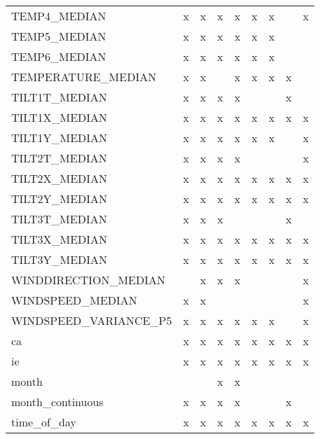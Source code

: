 \begin{longtable}{lllllllll}
          TEMP4\_MEDIAN &      x &      x &      x &      x &      x &      x &        &      x \\
          TEMP5\_MEDIAN &      x &      x &      x &      x &      x &      x &        &        \\
          TEMP6\_MEDIAN &      x &      x &      x &      x &      x &      x &        &        \\
    TEMPERATURE\_MEDIAN &      x &      x &        &      x &      x &      x &      x &        \\
         TILT1T\_MEDIAN &      x &      x &      x &      x &        &        &      x &        \\
         TILT1X\_MEDIAN &      x &      x &      x &      x &      x &      x &      x &      x \\
         TILT1Y\_MEDIAN &      x &      x &      x &      x &      x &      x &        &      x \\
         TILT2T\_MEDIAN &      x &      x &      x &      x &        &        &        &      x \\
         TILT2X\_MEDIAN &      x &      x &      x &      x &      x &      x &      x &      x \\
         TILT2Y\_MEDIAN &      x &      x &      x &      x &      x &      x &      x &      x \\
         TILT3T\_MEDIAN &      x &      x &      x &        &        &        &      x &        \\
         TILT3X\_MEDIAN &      x &      x &      x &      x &      x &      x &      x &      x \\
         TILT3Y\_MEDIAN &      x &      x &      x &      x &      x &      x &      x &      x \\
  WINDDIRECTION\_MEDIAN &        &      x &      x &      x &        &        &        &      x \\
      WINDSPEED\_MEDIAN &      x &      x &        &        &        &        &        &      x \\
 WINDSPEED\_VARIANCE\_P5 &      x &      x &      x &      x &      x &      x &        &      x \\
                    ca &      x &      x &      x &      x &      x &      x &      x &      x \\
                    ie &      x &      x &      x &      x &      x &      x &      x &      x \\
                 month &        &        &      x &      x &        &        &        &        \\
      month\_continuous &      x &      x &      x &      x &        &        &      x &        \\
           time\_of\_day &      x &      x &      x &      x &      x &      x &      x &      x \\
\end{longtable}
